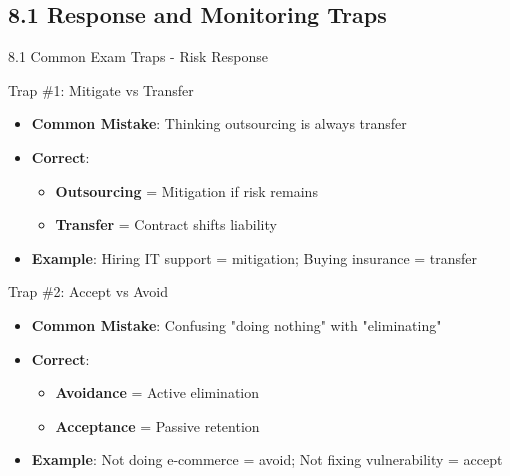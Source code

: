 \documentclass{beamer}
\begin{document}
	\subsection{8.1 Response and Monitoring Traps}
	\begin{frame}{8.1 Common Exam Traps - Risk Response}
		\begin{block}{Trap \#1: Mitigate vs Transfer}
			\begin{itemize}
				\item \textbf{Common Mistake}: Thinking outsourcing is always transfer
				\item \textbf{Correct}: 
				\begin{itemize}
					\item \textbf{Outsourcing} = Mitigation if risk remains
					\item \textbf{Transfer} = Contract shifts liability
				\end{itemize}
				\item \textbf{Example}: Hiring IT support = mitigation; Buying insurance = transfer
			\end{itemize}
		\end{block}
		
		\begin{block}{Trap \#2: Accept vs Avoid}
			\begin{itemize}
				\item \textbf{Common Mistake}: Confusing "doing nothing" with "eliminating"
				\item \textbf{Correct}: 
				\begin{itemize}
					\item \textbf{Avoidance} = Active elimination
					\item \textbf{Acceptance} = Passive retention
				\end{itemize}
				\item \textbf{Example}: Not doing e-commerce = avoid; Not fixing vulnerability = accept
			\end{itemize}
		\end{block}
	\end{frame}
	
\end{document}
